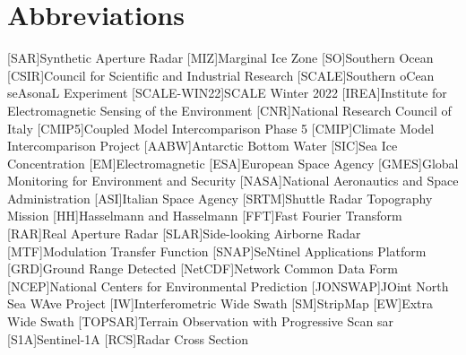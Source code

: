 

\chapter*{Abbreviations}
\begin{acronym}
        [SAR]{Synthetic Aperture Radar}
        [MIZ]{Marginal Ice Zone}
        [SO]{Southern Ocean}
        [CSIR]{Council for Scientific and Industrial Research}
        [SCALE]{Southern oCean seAsonaL Experiment}
        [SCALE-WIN22]{SCALE Winter 2022}
        [IREA]{Institute for Electromagnetic Sensing of the Environment}
        [CNR]{National Research Council of Italy}
        [CMIP5]{Coupled Model Intercomparison Phase 5}
        [CMIP]{Climate Model Intercomparison Project}
        [AABW]{Antarctic Bottom Water}
        [SIC]{Sea Ice Concentration}
        [EM]{Electromagnetic}
        [ESA]{European Space Agency}
        [GMES]{Global Monitoring for Environment and Security}
        [NASA]{National Aeronautics and Space Administration}
        [ASI]{Italian Space Agency}
        [SRTM]{Shuttle Radar Topography Mission}
        [HH]{Hasselmann and Hasselmann}
        [FFT]{Fast Fourier Transform}
        [RAR]{Real Aperture Radar}
        [SLAR]{Side-looking Airborne Radar}
        [MTF]{Modulation Transfer Function}
        [SNAP]{SeNtinel Applications Platform}
        [GRD]{Ground Range Detected}
        [NetCDF]{Network Common Data Form}
        [NCEP]{National Centers for Environmental Prediction}
        [JONSWAP]{JOint North Sea WAve Project}
        [IW]{Interferometric Wide Swath}
        [SM]{StripMap}
        [EW]{Extra Wide Swath}
        [TOPSAR]{Terrain Observation with Progressive Scan \acs{sar}}
        [S1A]{Sentinel-1A}
        [RCS]{Radar Cross Section}
\end{acronym}
